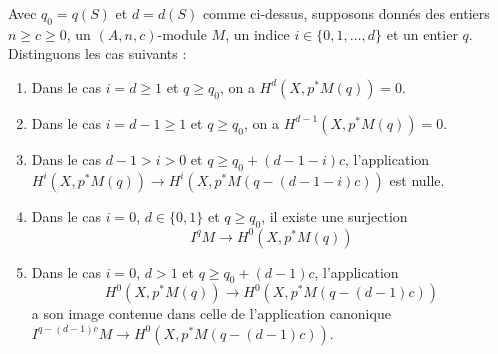 \begin{lemma}
\label{lemma-vanishing-coh-almost-projective}
Avec $q_0 = q(S)$ et $d = d(S)$ comme ci-dessus, supposons donnés des entiers $n \geq c \geq 0$, un $(A, n, c)$-module $M$, un indice $i \in \{0, 1, \ldots, d\}$ et un entier $q$. Distinguons les cas suivants :
\begin{enumerate}
\item Dans le cas $i = d \geq 1$ et $q \geq q_0$, on a $H^d(X, p^*M(q)) = 0$.
\item Dans le cas $i = d - 1 \geq 1$ et $q \geq q_0$, on a $H^{d - 1}(X, p^*M(q)) = 0$.
\item Dans le cas $d - 1 > i > 0$ et $q \geq q_0 + (d - 1 - i)c$, l'application $H^i(X, p^*M(q)) \to H^i(X, p^*M(q - (d - 1 - i)c))$ est nulle.
\item Dans le cas $i = 0$, $d \in \{0, 1\}$ et $q \geq q_0$, il existe une surjection
$$
I^qM \longrightarrow H^0(X, p^*M(q))
$$
\item Dans le cas $i = 0$, $d > 1$ et $q \geq q_0 + (d - 1)c$, l'application
$$
H^0(X, p^*M(q)) \to H^0(X, p^*M(q - (d - 1)c))
$$
a son image contenue dans celle de l'application canonique $I^{q - (d - 1)c}M \to H^0(X, p^*M(q - (d - 1)c))$.
\end{enumerate}
\end{lemma}

